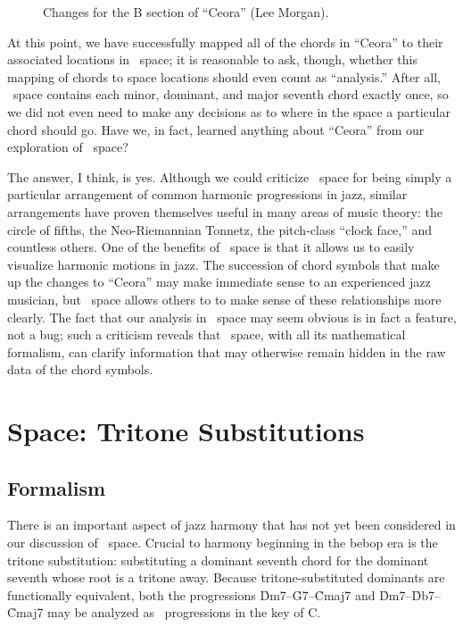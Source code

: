 \begin{figure}[htbp]
  \caption{Changes for the B section of ``Ceora'' (Lee Morgan).}
  \label{tf:ceora-changes-2}
\end{figure}

At this point, we have successfully mapped all of the chords in ``Ceora'' to
their associated locations in \tf\ space; it is reasonable to ask, though,
whether this mapping of chords to space locations should even count as
``analysis.'' After all, \tf\ space contains each minor, dominant, and major
seventh chord exactly once, so we did not even need to make any decisions as
to where in the space a particular chord should go. Have we, in fact, learned
anything about ``Ceora'' from our exploration of \tf\ space?

The answer, I think, is yes. Although we could criticize \tf\ space for being
simply a particular arrangement of common harmonic progressions in jazz,
similar arrangements have proven themselves useful in many areas of music
theory: the circle of fifths, the Neo-Riemannian Tonnetz, the pitch-class
``clock face,'' and countless others. One of the benefits of \tf\
space is that it allows us to easily visualize harmonic motions in jazz. The
succession of chord symbols that make up the changes to ``Ceora'' may make
immediate sense to an experienced jazz musician, but \tf\ space allows others
to to make sense of these relationships more clearly. The fact that our
analysis in \tf\ space may seem obvious is in fact a feature, not a bug; such
a criticism reveals that \tf\ space, with all its mathematical formalism,
can clarify information that may otherwise remain hidden in the raw data of
the chord symbols.\fn{tf-13}





\section{\tf Space: Tritone Substitutions}
\label{sec:tf-space-tritones}

\subsection{Formalism}

There is an important aspect of jazz harmony that has not yet been considered in
our discussion of \tf\ space. Crucial to harmony beginning in the bebop era is
the tritone substitution: substituting a dominant seventh chord for the
dominant seventh whose root is a tritone away.\fn{tft-1} Because
tritone-substituted dominants are functionally equivalent, both the
progressions \h{Dm7}--\h{G7}--\h{Cmaj7} and \h{Dm7}--\h{Db7}--\h{Cmaj7} may be
analyzed as \tfo\ progressions in the key of C.

